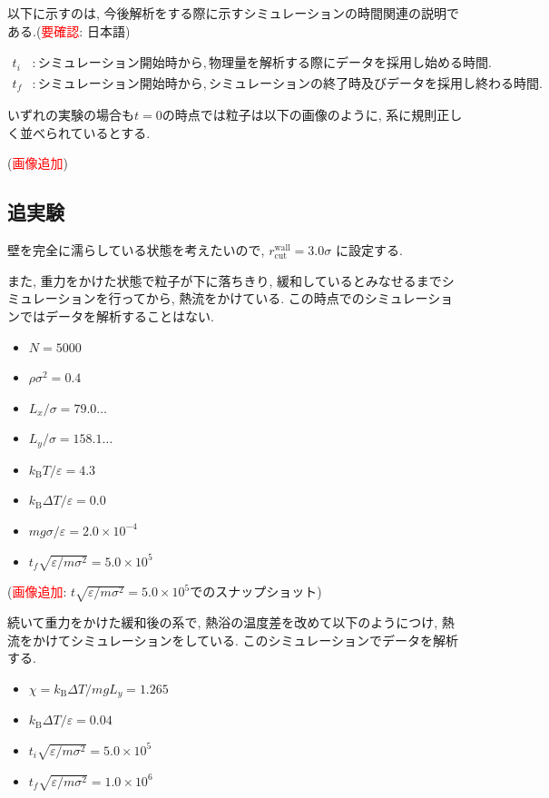 以下に示すのは, 今後解析をする際に示すシミュレーションの時間関連の説明である.(\textcolor{red}{要確認}: 日本語)

\begin{align}
  t_i &\colon シミュレーション開始時から, 物理量を解析する際にデータを採用し始める時間. \\
  t_f & \colon シミュレーション開始時から, シミュレーションの終了時及びデータを採用し終わる時間.
\end{align}

いずれの実験の場合も$t=0$の時点では粒子は以下の画像のように, 系に規則正しく並べられているとする.

(\textcolor{red}{画像追加})

\subsection{追実験}

壁を完全に濡らしている状態を考えたいので, $r^{\text{wall}}_{\text{cut}}=3.0\sigma$ に設定する.

また, 重力をかけた状態で粒子が下に落ちきり, 緩和しているとみなせるまでシミュレーションを行ってから, 熱流をかけている. この時点でのシミュレーションではデータを解析することはない.

\begin{itemize}
  \item $N = 5000$
  \item $\rho \sigma^2 = 0.4$
  \item $L_x / \sigma = 79.0\dots$
  \item $L_y / \sigma = 158.1\dots$
  \item $k_{\text{B}} T/\varepsilon = 4.3$
  \item $k_{\text{B}} \Delta T/\varepsilon = 0.0$
  \item $mg\sigma/\varepsilon = 2.0 \times 10^{-4}$
  \item $t_f \sqrt{\varepsilon / m \sigma^2} = 5.0 \times 10^{5}$
\end{itemize}

(\textcolor{red}{画像追加}: $t \sqrt{\varepsilon / m \sigma^2} = 5.0 \times 10^{5}$でのスナップショット)

続いて重力をかけた緩和後の系で, 熱浴の温度差を改めて以下のようにつけ, 熱流をかけてシミュレーションをしている. このシミュレーションでデータを解析する.

\begin{itemize}
  \item $\chi = k_{\text{B}}\Delta T / mg L_y = 1.265$
  \item $k_{\text{B}} \Delta T/\varepsilon = 0.04$
  \item $t_i \sqrt{\varepsilon / m \sigma^2} = 5.0 \times 10^{5}$
  \item $t_f \sqrt{\varepsilon / m \sigma^2} = 1.0 \times 10^{6}$
\end{itemize}

